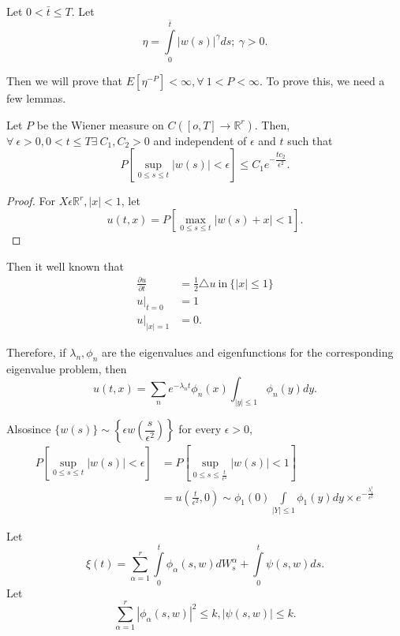 \begin{example}\label{chap2:exam2.1}%
  Let $0 < \bar{t} \leq T$. Let
  $$
  \eta=\int\limits_0^{\bar{t}}| w(s)|^{\gamma} ds; ~\gamma > 0.
  $$

  Then we will prove that $E[\eta^{-P}]< \infty, \forall~
  1<P<\infty$. To prove this, we need a few lemmas. 
\end{example}


\begin{alphlemma}\label{chap2:alphlemA}%
  Let $P$ be the Wiener measure on $C([o,T]\to \mathbb{R}^r)$. Then,
  $\forall~ \epsilon  > 0, 0<t \leq T \exists~ C_1, C_2> 0$ and
  independent of $\epsilon $ and $t$ such that 
  $$
  P\left[\sup_{0 \leq s \leq t}|w(s)| < \epsilon \right] \leq C_1
  e^{-\dfrac{tc_2}{\epsilon ^2}}. 
  $$
\end{alphlemma}



\begin{proof}
  For $X \epsilon  \mathbb{R}^r, |x|<1$, let
  $$
  u(t, x)=P \left[\max_{0 \leq s \leq t}| w(s)+x | < 1\right].
  $$
\end{proof}

Then it well known that
\begin{align*}
   \frac{\partial u}{\partial t}& =\frac{1}{2} \triangle u 
   ~\text{in}~ \{|x| \leq 1\}\\ 
    u|_{t=0}&=1\\ 
    u|_{|x|=1}&=0.
\end{align*}

Therefore, if $\lambda_n, \phi_n$ are the eigenvalues and
eigenfunctions for the corresponding eigenvalue problem, then 
$$
u(t,x)= \sum_n e^{-\lambda_n t}\phi_n(x) \int_{|y|\leq 1} \phi_n (y) dy.
$$

Also\pageoriginale since $\{w(s)\} \sim \left\{\epsilon  w
\left(\dfrac{s}{\epsilon ^2}\right)\right\}$ for every $\epsilon  > 0$, 
\begin{align*}
  P \left[\sup_{0 \leq s \leq t}| w(s) | < \epsilon \right]
  &=P \left[\sup_{0 \leq s \leq \frac{t}{\epsilon ^2}}| w(s) | < 1\right]\\
  &=u \left(\frac{t}{\epsilon ^2}, 0\right)\sim \phi_1(0) \int\limits_{|Y| \leq
    1}\phi_1(y)dy \times e^{-\frac{\lambda_1^t}{\epsilon ^2}} 
\end{align*}

\begin{alphlemma}\label{chap2:alphlemB}%
  Let
  $$
  \xi(t)= \sum_{\alpha=1}^{r} \int\limits_0^{t} \phi_{\alpha}(s,
  w)dW_s^{\alpha}+\int\limits_0^{t}\psi (s, w)ds.
  $$
  Let
  $$
  \sum_{\alpha=1}^r| \phi_{\alpha}(s, w)|^2 \leq k, | \psi(s, w)| \leq k.
  $$
\end{alphlemma}

